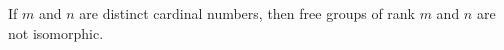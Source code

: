 If $m$ and $n$ are distinct cardinal numbers, then free groups of rank $m$ and $n$ are not isomorphic.
